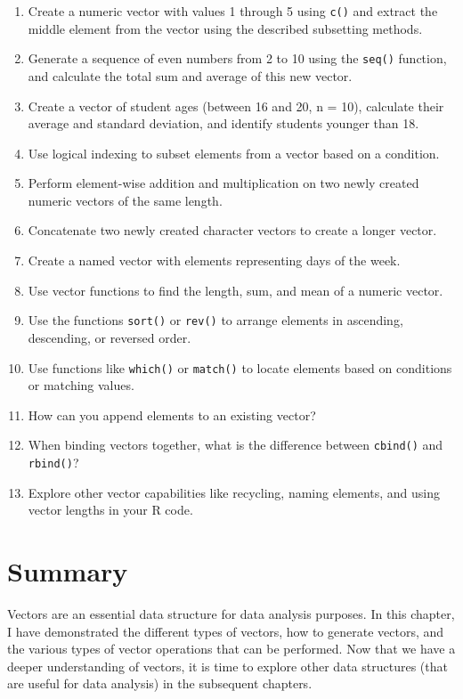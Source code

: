 \documentclass[
  letterpaper,
  DIV=11,
  numbers=noendperiod]{scrreprt}
\providecommand{\tightlist}{%
  \setlength{\itemsep}{0pt}\setlength{\parskip}{0pt}}\usepackage{longtable,booktabs,array}
\begin{document}
\begin{enumerate}
\def\labelenumi{\roman{enumi}.}
\tightlist
\item
  Create a numeric vector with values 1 through 5 using \texttt{c()} and
  extract the middle element from the vector using the described
  subsetting methods.
\item
  Generate a sequence of even numbers from 2 to 10 using the
  \texttt{seq()} function, and calculate the total sum and average of
  this new vector.
\item
  Create a vector of student ages (between 16 and 20, n = 10), calculate
  their average and standard deviation, and identify students younger
  than 18.
\item
  Use logical indexing to subset elements from a vector based on a
  condition.
\item
  Perform element-wise addition and multiplication on two newly created
  numeric vectors of the same length.
\item
  Concatenate two newly created character vectors to create a longer
  vector.
\item
  Create a named vector with elements representing days of the week.
\item
  Use vector functions to find the length, sum, and mean of a numeric
  vector.
\item
  Use the functions \texttt{sort()} or \texttt{rev()} to arrange
  elements in ascending, descending, or reversed order.
\item
  Use functions like \texttt{which()} or \texttt{match()} to locate
  elements based on conditions or matching values.
\item
  How can you append elements to an existing vector?
\item
  When binding vectors together, what is the difference between
  \texttt{cbind()} and \texttt{rbind()}?
\item
  Explore other vector capabilities like recycling, naming elements, and
  using vector lengths in your R code.
\end{enumerate}

\section{Summary}\label{summary-8}

Vectors are an essential data structure for data analysis purposes. In
this chapter, I have demonstrated the different types of vectors, how to
generate vectors, and the various types of vector operations that can be
performed. Now that we have a deeper understanding of vectors, it is
time to explore other data structures (that are useful for data
analysis) in the subsequent chapters.
\end{document}
